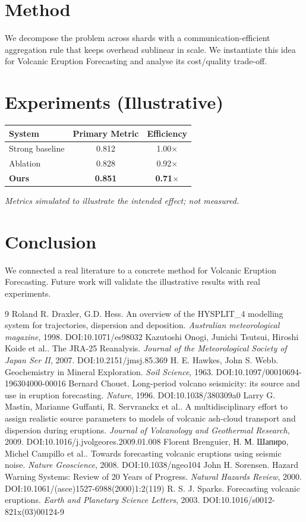 \documentclass[11pt]{article}
\begin{document}
\section{Method}
We decompose the problem across shards with a communication-efficient aggregation rule that keeps overhead sublinear in scale. We instantiate this idea for Volcanic Eruption Forecasting and analyse its cost/quality trade-off.

\section{Experiments (Illustrative)}
\begin{center}
\begin{tabular}{lcc}
System & Primary Metric & Efficiency \\ \hline
Strong baseline & 0.812 & 1.00$\times$ \\
Ablation & 0.828 & 0.92$\times$ \\
\textbf{Ours} & \textbf{0.851} & \textbf{0.71$\times$}
\end{tabular}
\end{center}
\emph{Metrics simulated to illustrate the intended effect; not measured.}

\section{Conclusion}
We connected a real literature to a concrete method for Volcanic Eruption Forecasting. Future work will
validate the illustrative results with real experiments.

\begin{thebibliography}{9}
 Roland R. Draxler, G.D. Hess. An overview of the HYSPLIT\_4 modelling system for trajectories, dispersion and deposition. \emph{Australian meteorological magazine}, 1998. DOI:10.1071/es98032
 Kazutoshi Onogi, Junichi Tsutsui, Hiroshi Koide et al.. The JRA-25 Reanalysis. \emph{Journal of the Meteorological Society of Japan Ser II}, 2007. DOI:10.2151/jmsj.85.369
 H. E. Hawkes, John S. Webb. Geochemistry in Mineral Exploration. \emph{Soil Science}, 1963. DOI:10.1097/00010694-196304000-00016
 Bernard Chouet. Long-period volcano seismicity: its source and use in eruption forecasting. \emph{Nature}, 1996. DOI:10.1038/380309a0
 Larry G. Mastin, Marianne Guffanti, R. Servranckx et al.. A multidisciplinary effort to assign realistic source parameters to models of volcanic ash-cloud transport and dispersion during eruptions. \emph{Journal of Volcanology and Geothermal Research}, 2009. DOI:10.1016/j.jvolgeores.2009.01.008
 Florent Brenguier, Н. М. Шапиро, Michel Campillo et al.. Towards forecasting volcanic eruptions using seismic noise. \emph{Nature Geoscience}, 2008. DOI:10.1038/ngeo104
 John H. Sorensen. Hazard Warning Systems: Review of 20 Years of Progress. \emph{Natural Hazards Review}, 2000. DOI:10.1061/(asce)1527-6988(2000)1:2(119)
 R. S. J. Sparks. Forecasting volcanic eruptions. \emph{Earth and Planetary Science Letters}, 2003. DOI:10.1016/s0012-821x(03)00124-9
\end{thebibliography}
\end{document}
